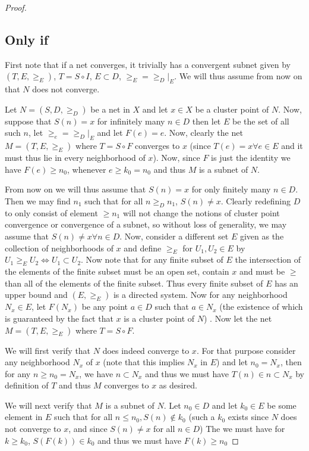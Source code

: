 \begin{proof}
\subsection*{Only if}
First note that if a net converges, it trivially has a convergent subnet given by $(T,E,\geq_E)$, $T=S\circ I$, $E\subset D$, $\geq_E = \geq_D|_E$. We will thus assume from now on that $N$ does not converge. \par
Let $N=(S,D,\geq_D)$ be a net in $X$ and let $x\in X$ be a cluster point of $N$. Now, suppose that $S(n) = x$ for infinitely many $n\in D$ then let $E$ be the set of all such $n$, let $\geq_e = \geq_D|_{E}$ and let $F(e)=e$. Now, clearly the net $M=(T,E,\geq_E)$ where $T=S\circ F$ converges to $x$ (since $T(e) = x \forall e\in E$ and it must thus lie in every neighborhood of $x$). Now, since $F$ is just the identity we have $F(e) \geq n_0$, whenever $e\geq k_0 = n_0$ and thus $M$ is a subnet of $N$. \par
From now on we will thus assume that $S(n)=x$ for only finitely many $n\in D$. Then we may find $n_1$ such that for all $n\geq_D n_1$, $S(n)\neq x$. Clearly redefining $D$ to only consist of element $\geq n_1$ will not change the notions of cluster point convergence or convergence of a subnet, so without loss of generality, we may assume that $S(n)\neq x \forall n\in D$. Now, consider a different set $E$ given as the collection of neighborhoods of $x$ and define $\geq_E$ for $U_1,U_2\in E$ by $U_1 \geq_E U_2 \iff U_1 \subset U_2$. Now note that for any finite subset of $E$ the intersection of the elements of the finite subset must be an open set, contain $x$ and must be $\geq$ than all of the elements of the  finite subset. Thus every finite subset of $E$ has an upper bound and $(E,\geq_E)$ is a directed system. Now for any neighborhood $N_x \in E$, let $F(N_x)$ be any point $a\in D$ such that $a\in N_x$ (the existence of which is guaranteed by the fact that $x$ is a cluster point of $N$) . Now let the net $M=(T,E,\geq_E)$ where $T=S\circ F$. \par
We will first verify that $N$ does indeed converge to $x$. For that purpose consider any neighborhood $N_x$ of $x$ (note that this implies $N_x$ in $E$) and let $n_0=N_x$, then for any $n\geq n_0=N_x$, we have $n\subset N_x$ and thus we must have $T(n)\in n \subset N_x$ by definition of $T$ and thus $M$ converges to $x$ as desired. \par 
We will next verify that $M$ is a subnet of $N$. Let $n_0\in D$ and let $k_0 \in E$ be some element in $E$ such that for all $n \leq n_0, S(n)\notin k_0$ (such a $k_0$ exists since $N$ does not converge to $x$, and since $S(n)\neq x$ for all $n\in D$)  The we must have for $k \geq k_0$, $S(F(k))\in k_0$ and thus we must have $F(k)\geq  n_0$
\end{proof}
